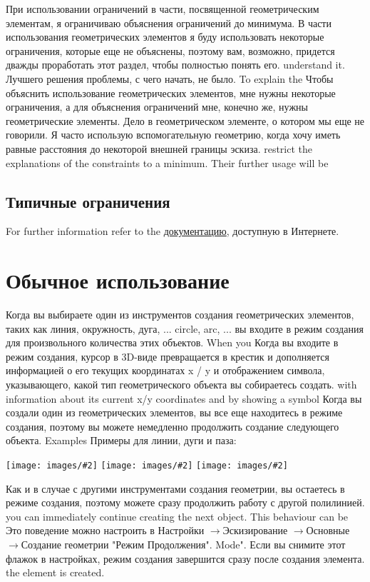 \documentclass[12pt,titlepage]{article}
\newcommand{\menu}{\mbox{$\rightarrow$}}
\newcommand{\img}[2]{\vspace{2ex}\noindent\texttt{[image: images/\#2]}}
\begin{document}
При использовании ограничений в части, посвященной геометрическим элементам, я ограничиваю объяснения ограничений до минимума.
В части использования геометрических элементов я буду использовать некоторые ограничения, которые еще не объяснены, поэтому вам, возможно, придется дважды проработать этот раздел, чтобы полностью понять его.
understand it. Лучшего решения проблемы, с чего начать, не было. To explain the
Чтобы объяснить использование геометрических элементов, мне нужны некоторые ограничения, а для объяснения ограничений мне, конечно же, нужны геометрические элементы.
Дело в геометрическом элементе, о котором мы еще не говорили. Я часто использую вспомогательную геометрию, когда хочу иметь равные расстояния до некоторой внешней границы эскиза.
restrict the explanations of the constraints to a minimum. Their further usage will be
\subsection*{Типичные ограничения}

For further information refer to the
\href {https://www.freecadweb.org/wiki/Sketcher_Workbench} {документацию}, доступную в Интернете.

\section{Обычное использование}
Когда вы выбираете один из инструментов создания геометрических элементов, таких как линия, окружность, дуга, ...
circle, arc, ...
вы входите в режим создания для произвольного количества этих объектов. When you
Когда вы входите в режим создания, курсор в 3D-виде превращается в крестик и дополняется информацией о его текущих координатах x / y и отображением символа, указывающего, какой тип геометрического объекта вы собираетесь создать.
with information about its current x/y coordinates and by showing a symbol
Когда вы создали один из геометрических элементов, вы все еще находитесь в режиме создания, поэтому вы можете немедленно продолжить создание следующего объекта. Examples
Примеры для линии, дуги и паза:

\img{width=0.3\textwidth}{CursorLine}\hfill
\img{width=0.3\textwidth}{CursorArc}\hfill
\img{width=0.3\textwidth}{CursorSlot}

Как и в случае с другими инструментами создания геометрии, вы остаетесь в режиме создания, поэтому можете сразу продолжить работу с другой полилинией.
you can immediately continue creating the next object. This behaviour can be
Это поведение можно настроить в Настройки \menu Эскизирование \menu Основные \menu Создание геометрии "Режим Продолжения".
Mode". Если вы снимите этот флажок в настройках, режим создания завершится сразу после создания элемента.
the element is created.
\end{document}
